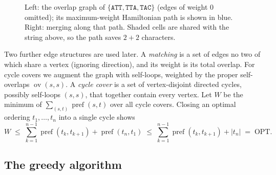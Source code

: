 \documentclass[11pt,a4paper]{article}   %
\newcommand{\cellrow}[3]{\foreach \ch [count=\ci from 0] in {#3}%
  {\node[strcell] at ({#1+\ci},#2) {\ch};}}
\newcommand{\shadecells}[4][ovfill]{\fill[#1] ({#2-0.5},{#4-0.5})
  rectangle ({#3+0.5},{#4+0.5});}
\theoremstyle{compact}
\theoremstyle{compactdef}
\newcommand{\OPT}{\mathrm{OPT}}
\newcommand{\ov}{\operatorname{ov}}         %
\newcommand{\str}[1]{\texttt{#1}}           %
\begin{document}
\begin{figure}[htb]\centering
{}
\caption{Left: the overlap graph of $\{\str{ATT},\str{TTA},\str{TAC}\}$
(edges of weight $0$ omitted); its maximum-weight Hamiltonian path is shown
in blue. Right: merging along that path. Shaded cells are shared with the
string above, so the path saves $2+2$ characters.}\label{fig:overlap-graph}
\end{figure}

Two further edge structures are used later. A \emph{matching} is a set of
edges no two of which share a vertex (ignoring direction), and its weight
is its total overlap. For cycle covers we augment the graph with self-loops, weighted by the
proper self-overlaps $\ov(s,s)$. A \emph{cycle cover} is a set of vertex-disjoint
directed cycles, possibly self-loops $(s,s)$, that together contain every
vertex. Let $W$ be the minimum of $\sum_{(s,t)}\operatorname{pref}(s,t)$
over all cycle covers. Closing an optimal ordering $t_1,\dots,t_n$ into a
single cycle shows
\begin{equation}\label{eq:W}
  W\;\le\;\textstyle\sum_{k=1}^{n-1}\operatorname{pref}(t_k,t_{k+1})
     +\operatorname{pref}(t_n,t_1)
  \;\le\;\textstyle\sum_{k=1}^{n-1}\operatorname{pref}(t_k,t_{k+1})+|t_n|
  \;=\;\OPT.
\end{equation}

\subsection{The greedy algorithm}
\end{document}
